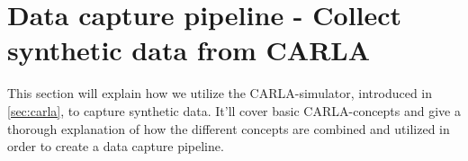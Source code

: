 \begin{comment}
This chapter elucidates the methodological approach employed in this research to explore the potential of Neural Radiance Fields (NeRF) in improving the synthetic data pipeline from CARLA to Nerfstudio. Our approach is underpinned by a systematic series of stages, each contributing to the robustness of the pipeline, and enabling us to establish a baseline leveraging synthetic data from CARLA.

We start this chapter by detailing the process of collecting synthetic data from CARLA, a sophisticated platform for generating artificial datasets. We explain our selection criteria and data collection techniques, aimed at maintaining consistency while ensuring the collected data is representative and fit for our objectives.

Next, we outline our procedure for integrating the collected data into the Nerfstudio environment. Our goal here is to ensure seamless data transition, optimising the pipeline for robust performance. A detailed description of the specific pipeline we created with CARLA data in Nerfstudio will follow.

A significant component of our method is establishing a CARLA baseline. We elucidate how this baseline was identified and what parameters were considered. Following the establishment of the baseline, we detail its application in various stages of our method.

The subsequent section focuses on the extension of the CARLA-baseline to support large-scale scenes using the concept of Block-NeRF. This is a vital aspect of our method that enables more extensive and complex scene rendering, thus broadening the application scope of our pipeline.

Lastly, we present an extension of the pipeline to accommodate input of real data, providing a pathway for future integration of real-world scenarios into the existing synthetic data pipeline. This element of our method is critical in considering the practicability of our pipeline beyond synthetic data environments.

By sequentially guiding the reader through our method, this chapter seeks to offer comprehensive insight into our research approach, underlying decisions, and considerations. This will lay a strong foundation for understanding the experimental results and discussions in the subsequent chapters.
\end{comment}

\section{Data capture pipeline - Collect synthetic data from CARLA}
This section will explain how we utilize the CARLA-simulator, introduced in \autoref{sec:carla}, to capture synthetic data. It'll cover basic CARLA-concepts and give a thorough explanation of how the different concepts are combined and utilized in order to create a data capture pipeline.

